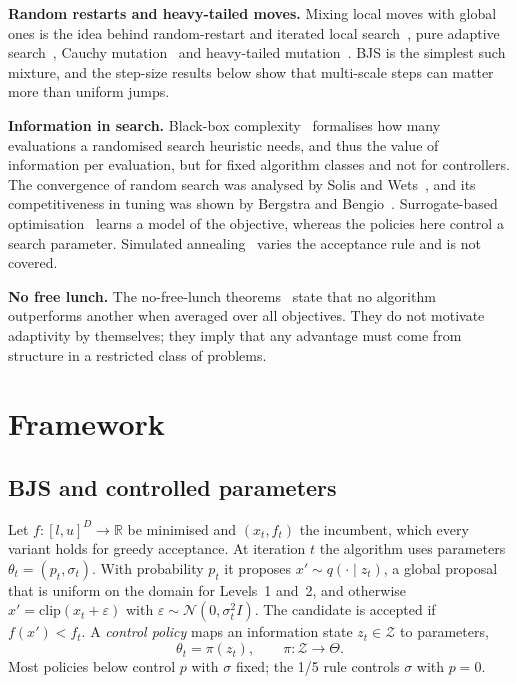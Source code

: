 \documentclass[conference]{IEEEtran}
\begin{document}
\textbf{Random restarts and heavy-tailed moves.} Mixing local moves with global ones is the idea behind random-restart and iterated local search~\cite{lourenco2003}, pure adaptive search~\cite{zabinsky1992}, Cauchy mutation~\cite{yao1999} and heavy-tailed mutation~\cite{doerr2017}. BJS is the simplest such mixture, and the step-size results below show that multi-scale steps can matter more than uniform jumps.

\textbf{Information in search.} Black-box complexity~\cite{droste2006} formalises how many evaluations a randomised search heuristic needs, and thus the value of information per evaluation, but for fixed algorithm classes and not for controllers. The convergence of random search was analysed by Solis and Wets~\cite{solis1981}, and its competitiveness in tuning was shown by Bergstra and Bengio~\cite{bergstra2012}. Surrogate-based optimisation~\cite{shahriari2016} learns a model of the objective, whereas the policies here control a search parameter. Simulated annealing~\cite{kirkpatrick1983} varies the acceptance rule and is not covered.

\textbf{No free lunch.} The no-free-lunch theorems~\cite{wolpert1997} state that no algorithm outperforms another when averaged over all objectives. They do not motivate adaptivity by themselves; they imply that any advantage must come from structure in a restricted class of problems.

\section{Framework}
\subsection{BJS and controlled parameters}
Let $f:[l,u]^D\to\mathbb{R}$ be minimised and $(x_t,f_t)$ the incumbent, which every variant holds for greedy acceptance. At iteration $t$ the algorithm uses parameters $\theta_t=(p_t,\sigma_t)$. With probability $p_t$ it proposes $x'\sim q(\cdot\mid z_t)$, a global proposal that is uniform on the domain for Levels~1 and~2, and otherwise $x'=\mathrm{clip}(x_t+\varepsilon)$ with $\varepsilon\sim\mathcal{N}(0,\sigma_t^2 I)$. The candidate is accepted if $f(x')<f_t$. A \emph{control policy} maps an information state $z_t\in\mathcal{Z}$ to parameters,
\begin{equation}
\theta_t=\pi(z_t),\qquad \pi:\mathcal{Z}\to\Theta .
\end{equation}
Most policies below control $p$ with $\sigma$ fixed; the 1/5 rule controls $\sigma$ with $p=0$.
\end{document}
